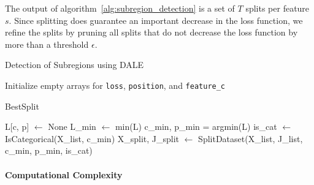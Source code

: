 \documentclass[12pt]{article}
\begin{document}
The output of algorithm~\ref{alg:subregion_detection} is a set of $T$ splits per feature $s$.
Since splitting does guarantee an important decrease in the loss function, we refine the splits by
pruning all splits that do not decrease the loss function by more than a threshold $\epsilon$.


\begin{algorithm}
\caption{Detection of Subregions using DALE}
\label{alg:subregion_detection}
\SetAlgoLined
{}
\BlankLine
{}
\BlankLine
{}
\BlankLine
Initialize empty arrays for \texttt{loss}, \texttt{position}, and \texttt{feature\_c}
\BlankLine
{}
\end{algorithm}

\begin{algorithm}
\caption{BestSplit}
\label{alg:single_feature_subregion}
\SetAlgoLined
{}


\BlankLine
L[c, p] $\gets$ None\; %
L\_min $\gets$ min(L)\;
c\_min, p\_min = argmin(L)\;
is\_cat $\gets$ IsCategorical(X\_list, c\_min)\;
X\_split, J\_split $\gets$ SplitDataset(X\_list, J\_list, c\_min, p\_min, is\_cat)\;

\BlankLine
\end{algorithm}

\paragraph{Computational Complexity}
\end{document}
